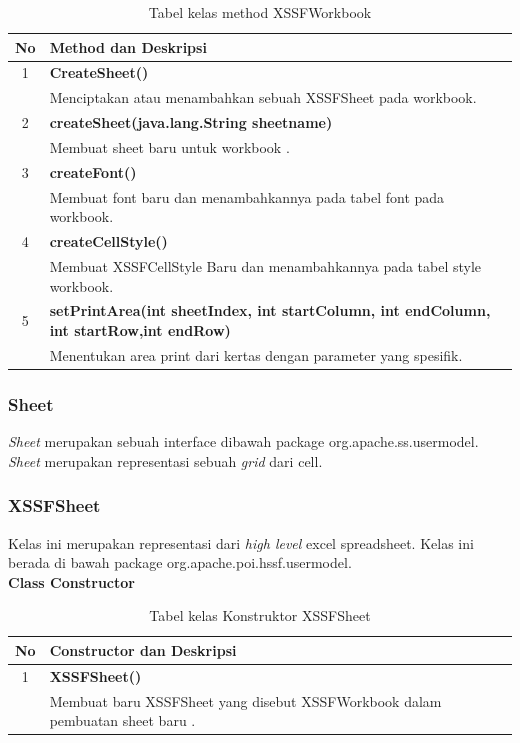 \begin{table}[H]
		\centering
		\caption{Tabel kelas method XSSFWorkbook}
		\label{tab:methodXSSF}
	\begin{tabular}{|c|p{12cm}|}
		\hline
		\textbf{No} & \textbf{Method dan Deskripsi} \\ \hline \hline
		1 & \textbf{CreateSheet()}\\
			&	Menciptakan atau menambahkan sebuah XSSFSheet pada workbook.\\ \hline 
		2 & \textbf{createSheet(java.lang.String sheetname)}\\
			&	Membuat sheet baru untuk workbook .\\ \hline
		3 & \textbf{createFont()}\\
			&	Membuat font baru dan menambahkannya pada tabel font pada workbook.\\ \hline 
		4 & \textbf{createCellStyle()}\\
			&	Membuat XSSFCellStyle Baru dan menambahkannya pada tabel style workbook.\\ \hline
		5 & \textbf{setPrintArea(int sheetIndex, int startColumn, int endColumn, int startRow,int endRow)}\\
			&	Menentukan area print dari kertas dengan parameter yang spesifik.\\ \hline	
	\end{tabular}
	\end{table}
	
\subsubsection{Sheet}
\label{subs:Sheet}
\textit{Sheet} merupakan sebuah interface dibawah package org.apache.ss.usermodel. \textit{Sheet} merupakan representasi sebuah \textit{grid} dari cell.\cite{apachepoi2}
	
\subsubsection{XSSFSheet}
\label{subs:XSSFSheet}
Kelas ini merupakan representasi dari \textit{high level} excel spreadsheet. Kelas ini berada di bawah package org.apache.poi.hssf.usermodel.\cite{apachepoi2}
\\
\noindent \textbf{Class Constructor}
\begin{table}[H]
		\centering
		\caption{Tabel kelas Konstruktor XSSFSheet}
		\label{tab:konstrukXSSFSheet}
	\begin{tabular}{|c|p{12cm}|}
		\hline
		\textbf{No} & \textbf{Constructor dan Deskripsi} \\ \hline \hline
		1 & \textbf{XSSFSheet()}\\
			&	Membuat baru XSSFSheet yang disebut XSSFWorkbook dalam pembuatan sheet baru .\\ \hline 
	\end{tabular}
\end{table}


